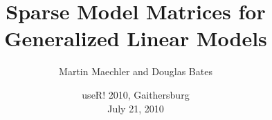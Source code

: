 \usepackage[english]{babel}
\usepackage[utf8]{inputenc}
\usepackage{relsize}%
\usepackage{mmVignette}%
\usepackage{MM-slides}%
\usepackage{MM-colors}%
%
\newcommand{\Rp}{\textsf{R}}
\newcommand*{\CRAN}{\textsc{cran}$\;$}
\newcommand*{\W}{\ensuremath{\mathbf{W}}}
\newcommand*{\Ip}{\mathbf{I}_p}
\newcommand{\fn}[1]{\kern-2pt\left(#1\right)}
\newcommand{\Ew}[1]{\mathbf{E}\kern2pt\fn{#1}}
%
%


\title[Sparse Model Matrices for GLM's]{%
Sparse Model Matrices for Generalized Linear Models
}

\author[Martin Maechler, Doug Bates]{Martin Maechler and Douglas Bates}
\date[useR! @ NIST, 2010]{useR! 2010, Gaithersburg \\ July 21, 2010}

